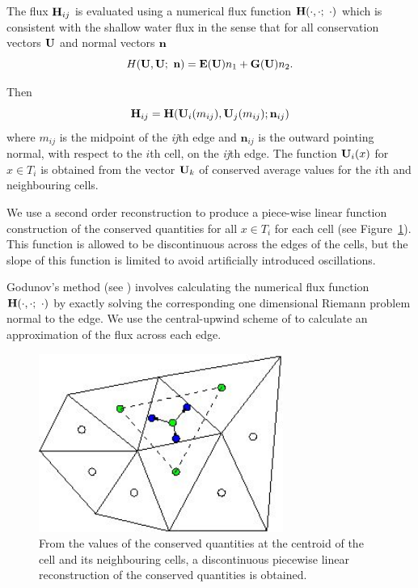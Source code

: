 \documentclass{manual}
\begin{document}

The flux $\mathbf{H}_{ij}$ is evaluated using a numerical flux function
$\mathbf{H}(\cdot, \cdot ; \ \cdot)$ which is consistent with the shallow
water flux in the sense that for all conservation vectors $\mathbf{U}$ and normal vectors $\mathbf{n}$
$$
H(\mathbf{U},\mathbf{U};\ \mathbf{n}) = \mathbf{E}(\mathbf{U}) n_1 + \mathbf{G}(\mathbf{U}) n_2 .
$$

Then
$$
\mathbf{H}_{ij}  = \mathbf{H}(\mathbf{U}_i(m_{ij}),
\mathbf{U}_j(m_{ij}); \mathbf{n}_{ij})
$$
where $m_{ij}$ is the midpoint of the \textit{ij}th edge and
$\mathbf{n}_{ij}$ is the outward pointing normal, with respect to the $i$th cell, on the
\textit{ij}th edge. The function $\mathbf{U}_i(x)$ for $x \in
T_i$ is obtained from the vector $\mathbf{U}_k$ of conserved average values for the $i$th and
neighbouring  cells.

We use a second order reconstruction to produce a piece-wise linear
function construction of the conserved quantities for  all $x \in
T_i$ for each cell (see Figure~\ref{fig:mesh:reconstruct}). This
function is allowed to be discontinuous across the edges of the
cells, but the slope of this function is limited to avoid
artificially introduced oscillations.

Godunov's method (see \cite{Toro1992}) involves calculating the
numerical flux function $\mathbf{H}(\cdot, \cdot ; \ \cdot)$ by exactly
solving the corresponding one dimensional Riemann problem normal to
the edge. We use the central-upwind scheme of \cite{KurNP2001} to
calculate an approximation of the flux across each edge.

\begin{figure}[htp] \begin{center}
  \includegraphics[width=8.0cm,keepaspectratio=true]{graphics/step-reconstruct}
  \caption{From the values of the conserved quantities at the centroid
           of the cell and its neighbouring cells, a discontinuous piecewise
           linear reconstruction of the conserved quantities is obtained.}
  \label{fig:mesh:reconstruct}
\end{center} \end{figure}
\end{document}
